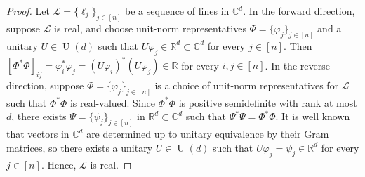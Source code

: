 \begin{proof}
Let $\mathscr{L} = \{ \ell_j \}_{j\in [n]}$ be a sequence of lines in $\mathbb{C}^d$.
In the forward direction, suppose $\mathscr{L}$ is real, and choose unit-norm representatives $\Phi = \{ \varphi_j \}_{j\in [n]}$ and a unitary $U \in \operatorname{U}(d)$ such that $U \varphi_j \in \mathbb{R}^d \subset \mathbb{C}^d$ for every $j \in [n]$.
Then $[\Phi^* \Phi]_{ij} = \varphi_i^* \varphi_j = (U \varphi_i)^* (U \varphi_j) \in \mathbb{R}$ for every $i,j \in [n]$.
In the reverse direction, suppose $\Phi = \{ \varphi_j \}_{j\in[n]}$ is a choice of unit-norm representatives for $\mathscr{L}$ such that $\Phi^* \Phi$ is real-valued.
Since $\Phi^* \Phi$ is positive semidefinite with rank at most $d$, there exists $\Psi = \{ \psi_j \}_{j \in [n]}$ in $\mathbb{R}^d \subset \mathbb{C}^d$ such that $\Psi^* \Psi = \Phi^*\Phi$.
It is well known that vectors in $\mathbb{C}^d$ are determined up to unitary equivalence by their Gram matrices, so there exists a unitary $U \in \operatorname{U}(d)$ such that $U \varphi_j = \psi_j \in \mathbb{R}^d$ for every $j \in [n]$.
Hence, $\mathscr{L}$ is real.
\end{proof}


